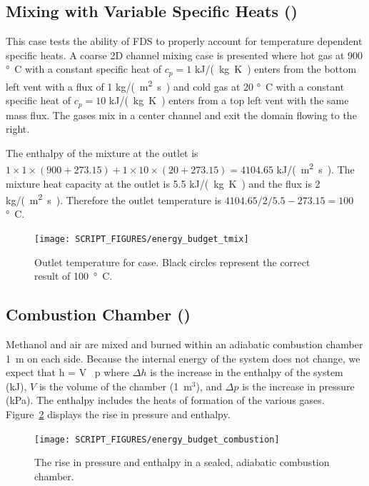 \documentclass[11pt]{book}
\begin{document}
\subsection{Mixing with Variable Specific Heats (\texorpdfstring{}{energy\_budget\_tmix})}
\label{energy_budget_tmix}

This case tests the ability of FDS to properly account for temperature dependent specific heats.  A coarse 2D channel mixing case is presented where hot gas at 900 \si{\degree C} with a constant specific heat of $c_p=1$ \si{kJ/(kg.K)} enters from the bottom left vent with a flux of 1 \si{kg/(m^2.s)} and cold gas at 20 \si{\degree C} with a constant specific heat of $c_p=10$ \si{kJ/(kg.K)} enters from a top left vent with the same mass flux.  The gases mix in a center channel and exit the domain flowing to the right.

The enthalpy of the mixture at the outlet is $1 \times 1 \times (900+273.15) + 1 \times 10 \times (20+273.15) = 4104.65$ \si{kJ/(m^2.s)}.  The mixture heat capacity at the outlet is 5.5 \si{kJ/(kg.K)} and the flux is 2 \si{kg/(m^2.s)}.  Therefore the outlet temperature is $4104.65/2/5.5 - 273.15 = 100$ \si{\degree C}.
\begin{figure}[ht]
\centering
\texttt{[image: SCRIPT\_FIGURES/energy\_budget\_tmix]}
\caption[The  test case]{\label{fig_outlet_temperature} Outlet temperature for  case.  Black circles represent the correct result of 100~\si{\degree C}.}
\end{figure}


\subsection{Combustion Chamber (\texorpdfstring{}{energy\_budget\_combustion})}
\label{energy_budget_combustion}

Methanol and air are mixed and burned within an adiabatic combustion chamber 1~m on each side. Because the internal energy of the system does not change, we expect that
\be
\Delta h = V \, \Delta p
\ee
where $\Delta h$ is the increase in the enthalpy of the system (kJ), $V$ is the volume of the chamber (1~m$^3$), and $\Delta p$ is the increase in pressure (kPa). The enthalpy includes the heats of formation of the various gases. Figure~\ref{fig_energy_budget_combustion} displays the rise in pressure and enthalpy.
\begin{figure}[ht]
\centering
\texttt{[image: SCRIPT\_FIGURES/energy\_budget\_combustion]}
\caption[The  test case]{The rise in pressure and enthalpy in a sealed, adiabatic combustion chamber.}
\label{fig_energy_budget_combustion}
\end{figure}
\end{document}
